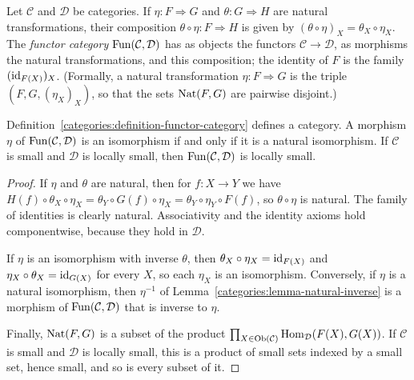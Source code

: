 \begin{definition}\label{categories:definition-functor-category}
Let $\mathcal{C}$ and $\mathcal{D}$ be categories. If
$\eta \colon F \Rightarrow G$ and $\theta \colon G \Rightarrow H$ are natural
transformations, their composition $\theta \circ \eta \colon F \Rightarrow H$
is given by $(\theta \circ \eta)_X = \theta_X \circ \eta_X$. The
\emph{functor category} $\operatorname{Fun}(\mathcal{C}, \mathcal{D})$ has as objects the
functors $\mathcal{C} \to \mathcal{D}$, as morphisms the natural
transformations, and this composition; the identity of $F$ is the family
$(\mathrm{id}_{F(X)})_X$. (Formally, a natural transformation
$\eta \colon F \Rightarrow G$ is the triple $(F, G, (\eta_X)_X)$, so that the
sets $\operatorname{Nat}(F, G)$ are pairwise disjoint.)
\end{definition}

\begin{lemma}\label{categories:lemma-functor-category}
Definition~\ref{categories:definition-functor-category} defines a category.
A morphism $\eta$ of $\operatorname{Fun}(\mathcal{C}, \mathcal{D})$ is an isomorphism if and
only if it is a natural isomorphism. If $\mathcal{C}$ is small and
$\mathcal{D}$ is locally small, then $\operatorname{Fun}(\mathcal{C}, \mathcal{D})$ is
locally small.
\end{lemma}

\begin{proof}
If $\eta$ and $\theta$ are natural, then for $f \colon X \to Y$ we have
$H(f) \circ \theta_X \circ \eta_X = \theta_Y \circ G(f) \circ \eta_X
= \theta_Y \circ \eta_Y \circ F(f)$, so $\theta \circ \eta$ is natural. The
family of identities is clearly natural. Associativity and the identity
axioms hold componentwise, because they hold in $\mathcal{D}$.

If $\eta$ is an isomorphism with inverse $\theta$, then
$\theta_X \circ \eta_X = \mathrm{id}_{F(X)}$ and $\eta_X \circ \theta_X = \mathrm{id}_{G(X)}$
for every $X$, so each $\eta_X$ is an isomorphism. Conversely, if $\eta$ is a
natural isomorphism, then $\eta^{-1}$ of
Lemma~\ref{categories:lemma-natural-inverse} is a morphism of
$\operatorname{Fun}(\mathcal{C}, \mathcal{D})$ that is inverse to $\eta$.

Finally, $\operatorname{Nat}(F, G)$ is a subset of the product
$\prod_{X \in \operatorname{Ob}(\mathcal{C})} \operatorname{Hom}_{\mathcal{D}}(F(X), G(X))$. If
$\mathcal{C}$ is small and $\mathcal{D}$ is locally small, this is a product
of small sets indexed by a small set, hence small, and so is every subset
of it.
\end{proof}

